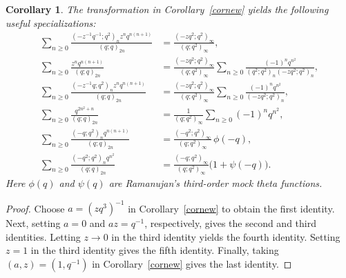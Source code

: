 \documentclass[11pt]{amsart}
\newtheorem{cor}[theorem]{Corollary}
\theoremstyle{definition}
\theoremstyle{remark}
\numberwithin{equation}{section}
\begin{document}
\begin{cor}\label{cor:S1-specializations}
The transformation in Corollary~\ref{cornew} yields the following useful specializations:
\begin{align}
\sum_{n\ge 0}\frac{(-z^{-1}q^{-1};q^2)_n z^n q^{n(n+1)}}{(q;q)_{2n}}
&=\frac{(-zq^2;q^2)_\infty}{(q;q^2)_\infty},\label{eq:S1-product-specialization}\\
\sum_{n\ge 0}\frac{z^nq^{n(n+1)}}{(q;q)_{2n}}
&=\frac{(-zq^2;q^2)_\infty}{(q;q^2)_\infty}
\sum_{n\ge 0}\frac{(-1)^nq^{n^2}}{(q^2;q^2)_n(-zq^2;q^2)_n},\label{eq:S1-a0-specialization}\\
\sum_{n\ge 0}\frac{(-z^{-1}q;q^2)_n z^nq^{n(n+1)}}{(q;q)_{2n}}
&=\frac{(-zq^2;q^2)_\infty}{(q;q^2)_\infty}
\sum_{n\ge 0}\frac{(-1)^nq^{n^2}}{(-zq^2;q^2)_n},\label{eq:S1-az-specialization}\\
\sum_{n\ge 0}\frac{q^{2n^2+n}}{(q;q)_{2n}}
&=\frac{1}{(q;q^2)_\infty}\sum_{n\ge 0}(-1)^nq^{n^2},\label{eq:S1-limit-specialization}\\
\sum_{n\ge 0}\frac{(-q;q^2)_nq^{n(n+1)}}{(q;q)_{2n}}
&=\frac{(-q^2;q^2)_\infty}{(q;q^2)_\infty}\,\phi(-q),\label{eq:S1-phi-specialization}\\
\sum_{n\ge 0}\frac{(-q^2;q^2)_nq^{n^2}}{(q;q)_{2n}}
&=\frac{(-q;q^2)_\infty}{(q;q^2)_\infty}\bigl(1+\psi(-q)\bigr).\label{eq:S1-psi-specialization}
\end{align}
Here $\phi(q)$ and $\psi(q)$ are Ramanujan's third-order mock theta functions.
\end{cor}
\begin{proof}
Choose $a=(zq^3)^{-1}$ in Corollary~\ref{cornew} to obtain the first identity. Next, setting $a=0$ and $az=q^{-1}$, respectively, gives the second and third identities. Letting $z\to0$ in the third identity yields the fourth identity. Setting $z=1$ in the third identity gives the fifth identity. Finally, taking $(a,z)=(1,q^{-1})$ in Corollary~\ref{cornew} gives the last identity.
\end{proof}
\end{document}
